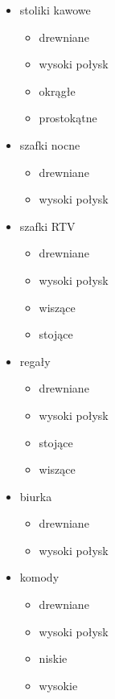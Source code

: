 \begin{itemize}
				\item{stoliki kawowe}
                \begin{itemize}
                    \item drewniane
                    \item wysoki połysk
                    \item okrągłe
                    \item prostokątne
                \end{itemize}
					
				\item{szafki nocne}
                \begin{itemize}
                    \item drewniane
                    \item wysoki połysk
                \end{itemize}
					
				\item{szafki RTV}
                \begin{itemize}
                    \item drewniane
                    \item wysoki połysk
                    \item wiszące
                    \item stojące
                \end{itemize}
					
            \item{regały}
                \begin{itemize}
                    \item drewniane
                    \item wysoki połysk
                    \item stojące
                    \item wiszące
                \end{itemize}
				
            \item{biurka}
                \begin{itemize}
                    \item drewniane
                    \item wysoki połysk
                \end{itemize}
				
            \item{komody}
                \begin{itemize}
                    \item drewniane
                    \item wysoki połysk
                    \item niskie
                    \item wysokie
                \end{itemize}
		\end{itemize}
	
